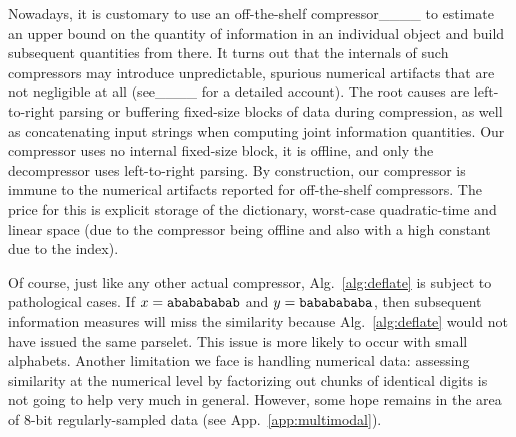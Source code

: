 Nowadays, it is customary to use an off-the-shelf compressor____ to estimate an upper bound on the quantity of information in an individual object and build subsequent quantities from there. It turns out that the internals of such compressors may introduce unpredictable, spurious numerical artifacts that are not negligible at all (see____ for a detailed account). The root causes are left-to-right parsing or buffering fixed-size blocks of data during compression, as well as concatenating input strings when computing joint information quantities. Our compressor uses no internal fixed-size block, it is offline, and only the decompressor uses left-to-right parsing. By construction, our compressor is immune to the numerical artifacts reported for off-the-shelf compressors. The price for this is explicit storage of the dictionary, worst-case quadratic-time and linear space (due to the compressor being offline and also with a high constant due to the index).

Of course, just like any other actual compressor, Alg.~\ref{alg:deflate} is subject to pathological cases. If $x=\mbox{\texttt{ababababab}}$ and $y=\mbox{\texttt{bababababa}}$, then subsequent information measures will miss the similarity because Alg.~\ref{alg:deflate} would not have issued the same parselet. This issue is more likely to occur with small alphabets. Another limitation we face is handling numerical data: assessing similarity at the numerical level by factorizing out chunks of identical digits is not going to help very much in general. However, some hope remains in the area of 8-bit regularly-sampled data (see App.~\ref{app:multimodal}).